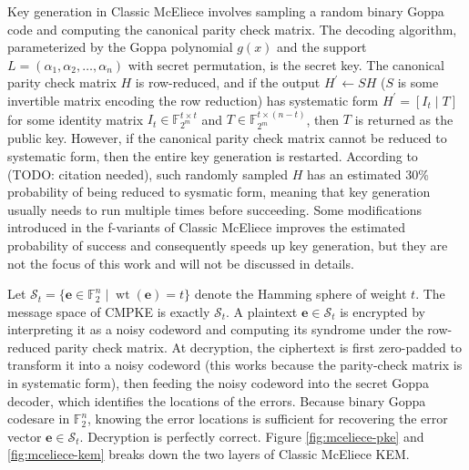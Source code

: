 \documentclass[runningheads]{llncs}
\newcommand{\wt}{\mathop{wt}}
\begin{document}
Key generation in Classic McEliece involves sampling a random binary Goppa code and computing the canonical parity check matrix. The decoding algorithm, parameterized by the Goppa polynomial $g(x)$ and the support $L = (\alpha_1, \alpha_2, \ldots, \alpha_n)$ with secret permutation, is the secret key. The canonical parity check matrix $H$ is row-reduced, and if the output $H^\prime \leftarrow SH$ ($S$ is some invertible matrix encoding the row reduction) has systematic form $H^\prime = [I_t \mid T]$ for some identity matrix $I_t \in \mathbb{F}_{2^m}^{t \times t}$ and $T \in \mathbb{F}_{2^m}^{t \times (n - t)}$, then $T$ is returned as the public key. However, if the canonical parity check matrix cannot be reduced to systematic form, then the entire key generation is restarted. According to (TODO: citation needed), such randomly sampled $H$ has an estimated 30\% probability of being reduced to sysmatic form, meaning that key generation usually needs to run multiple times before succeeding. Some modifications introduced in the f-variants of Classic McEliece improves the estimated probability of success and consequently speeds up key generation, but they are not the focus of this work and will not be discussed in details.

Let $\mathcal{S}_t = \{\mathbf{e} \in \mathbb{F}_2^n \mid \wt(\mathbf{e}) = t\}$ denote the Hamming sphere of weight $t$. The message space of CMPKE is exactly $\mathcal{S}_t$. A plaintext $\mathbf{e}\in\mathcal{S}_t$ is encrypted by interpreting it as a noisy codeword and computing its syndrome under the row-reduced parity check matrix. At decryption, the ciphertext is first zero-padded to transform it into a noisy codeword (this works because the parity-check matrix is in systematic form), then feeding the noisy codeword into the secret Goppa decoder, which identifies the locations of the errors. Because binary Goppa codesare in $\mathbb{F}_2^n$, knowing the error locations is sufficient for recovering the error vector $\mathbf{e}\in\mathcal{S}_t$. Decryption is perfectly correct. Figure \ref{fig:mceliece-pke} and \ref{fig:mceliece-kem} breaks down the two layers of Classic McEliece KEM.
\end{document}
